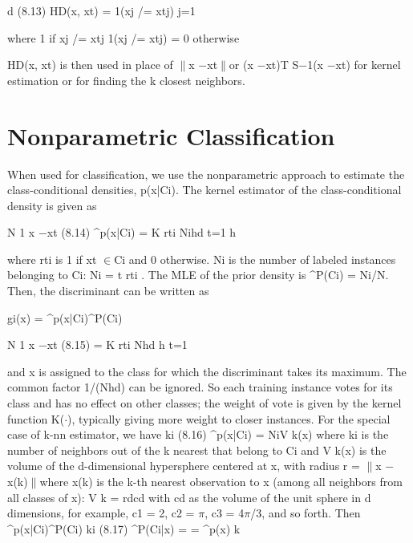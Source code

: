 d (8.13) HD(x, xt) = 1(xj /= xtj) j=1

where 1 if xj /= xtj 1(xj /= xtj) = 0 otherwise

HD(x, xt) is then used in place of $\parallel$x $-$xt$\parallel$or (x $-$xt)T S$-$1(x $-$xt) for kernel estimation or for finding the k closest neighbors.

\section{Nonparametric Classification}

When used for classification, we use the nonparametric approach to estimate the class-conditional densities, p(x|Ci). The kernel estimator of the class-conditional density is given as

N 1 x $-$xt (8.14) \textasciicircum{}p(x|Ci) = K rti Nihd t=1 h

where rti is 1 if xt $\in$Ci and 0 otherwise. Ni is the number of labeled instances belonging to Ci: Ni = t rti . The MLE of the prior density is \textasciicircum{}P(Ci) = Ni/N. Then, the discriminant can be written as

gi(x) = \textasciicircum{}p(x|Ci)\textasciicircum{}P(Ci)

N 1 x $-$xt (8.15) = K rti Nhd h t=1

and x is assigned to the class for which the discriminant takes its maximum. The common factor 1/(Nhd) can be ignored. So each training instance votes for its class and has no effect on other classes; the weight of vote is given by the kernel function K($\cdot$), typically giving more weight to closer instances. For the special case of k-nn estimator, we have ki (8.16) \textasciicircum{}p(x|Ci) = NiV k(x) where ki is the number of neighbors out of the k nearest that belong to Ci and V k(x) is the volume of the d-dimensional hypersphere centered at x, with radius r = $\parallel$x $-$x(k)$\parallel$where x(k) is the k-th nearest observation to x (among all neighbors from all classes of x): V k = rdcd with cd as the volume of the unit sphere in d dimensions, for example, c1 = 2, c2 = $\pi$, c3 = 4$\pi$/3, and so forth. Then \textasciicircum{}p(x|Ci)\textasciicircum{}P(Ci) ki (8.17) \textasciicircum{}P(Ci|x) = = \textasciicircum{}p(x) k

